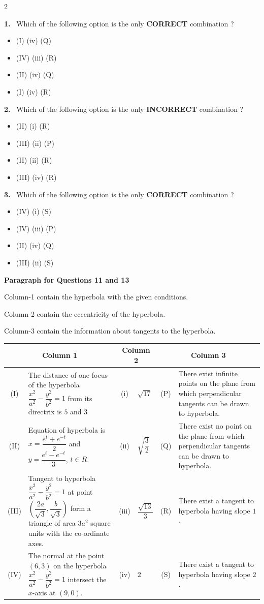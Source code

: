 \documentclass[10pt]{extarticle}
\newcommand{\qn}[1]{\par\smallskip\noindent\textbf{#1.}~}
\newcommand{\paraq}[2]{\par\smallskip\noindent\textbf{Paragraph for Questions #1 and #2}\par}
\newenvironment{qoptions}{\begin{itemize}[leftmargin=1.8em,itemsep=1pt,topsep=2pt,label={}]}{\end{itemize}}
\newcommand{\opt}[2]{\item[(#1)] #2}
\begin{document}
\begin{multicols}{2}
\qn{1} Which of the following option is the only \textbf{CORRECT} combination ?
\begin{qoptions}
\opt{A}{(I) (iv) (Q)}
\opt{B}{(IV) (iii) (R)}
\opt{C}{(II) (iv) (Q)}
\opt{D}{(I) (iv) (R)}
\end{qoptions}
\qn{2} Which of the following option is the only \textbf{INCORRECT} combination ?
\begin{qoptions}
\opt{A}{(II) (i) (R)}
\opt{B}{(III) (ii) (P)}
\opt{C}{(II) (ii) (R)}
\opt{D}{(III) (iv) (R)}
\end{qoptions}
\qn{3} Which of the following option is the only \textbf{CORRECT} combination ?
\begin{qoptions}
\opt{A}{(IV) (i) (S)}
\opt{B}{(IV) (iii) (P)}
\opt{C}{(II) (iv) (Q)}
\opt{D}{(III) (ii) (S)}
\end{qoptions}
\paraq{11}{13}
Column-1 contain the hyperbola with the given conditions.

Column-2 contain the eccentricity of the hyperbola.

Column-3 contain the information about tangents to the hyperbola.

\end{multicols}
\begin{center}\small\setlength{\tabcolsep}{4pt}
\begin{tabular}{|c|p{5.5cm}|c|p{1.2cm}|c|p{5.5cm}|}\hline
\multicolumn{2}{|c|}{Column 1} & \multicolumn{2}{c|}{Column 2} & \multicolumn{2}{c|}{Column 3}\\\hline
(I) & The distance of one focus of the hyperbola $\dfrac{x^2}{a^2}-\dfrac{y^2}{b^2}=1$ from its directrix is $5$ and $3$ & (i) & $\sqrt{17}$ & (P) & There exist infinite points on the plane from which perpendicular tangents can be drawn to hyperbola.\\\hline
(II) & Equation of hyperbola is $x=\dfrac{e^t+e^{-t}}{2}$ and $y=\dfrac{e^t-e^{-t}}{3}$, $t\in R$. & (ii) & $\sqrt{\dfrac32}$ & (Q) & There exist no point on the plane from which perpendicular tangents can be drawn to hyperbola.\\\hline
(III) & Tangent to hyperbola $\dfrac{x^2}{a^2}-\dfrac{y^2}{b^2}=1$ at point $\left(\dfrac{2a}{\sqrt3},\dfrac{b}{\sqrt3}\right)$ form a triangle of area $3a^2$ square units with the co-ordinate axes. & (iii) & $\dfrac{\sqrt{13}}3$ & (R) & There exist a tangent to hyperbola having slope $1$.\\\hline
(IV) & The normal at the point $(6,3)$ on the hyperbola $\dfrac{x^2}{a^2}-\dfrac{y^2}{b^2}=1$ intersect the $x$-axis at $(9,0)$. & (iv) & $2$ & (S) & There exist a tangent to hyperbola having slope $2$.\\\hline
\end{tabular}
\end{center}
\end{document}
